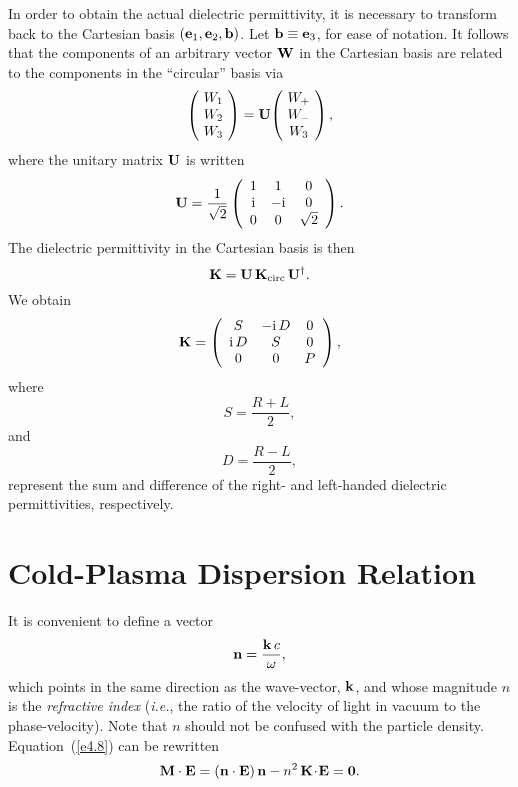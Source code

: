 In order to obtain the actual dielectric permittivity, it is necessary
to transform back to the Cartesian basis $({\bf e}_1, {\bf e}_2, {\bf b})$.
Let ${\bf b} \equiv {\bf e}_3$, for ease of notation. It follows that
the components of an arbitrary vector ${\bf W}$ in the Cartesian basis are
related to the components in the ``circular'' basis via
\begin{equation}
\left(\!\begin{array}{c} W_1 \\ W_2 \\ W_3 \end{array}\! \right) = 
{\bf U} \!\left(\!\begin{array}{c} W_+ \\ W_- \\ W_3 \end{array}\! \right),
\end{equation}
where the unitary matrix ${\bf U}$ is written
\begin{equation}
{\bf U} = \frac{1}{\sqrt{2}}\left(\begin{array}{ccc}
1&1&0\\
{\rm i} & -{\rm i}&0\\
0&0&\sqrt{2}\end{array}
\right).
\end{equation}
The dielectric permittivity in the Cartesian basis is then
\begin{equation}
{\bf K} = {\bf U}\, {\bf K}_{\rm circ}\, {\bf U}^\dag.
\end{equation}
We obtain
\begin{equation}\label{e4.36x}
{\bf K} = \left(\begin{array}{ccc}
S&-{\rm i}\,D&0\\
{\rm i}\,D & S&0\\
0&0&P\end{array}
\right),
\end{equation}
where 
\begin{equation}
S =\frac{R+L}{2},
\end{equation}
and
\begin{equation}
D = \frac{R-L}{2},
\end{equation}
represent the sum and difference of the right- and left-handed dielectric
permittivities, respectively.

\section{Cold-Plasma Dispersion Relation}
It is convenient to define a vector
\begin{equation}
{\bf n} = \frac{{\bf k}\,c}{\omega},
\end{equation}
which points in the same direction as the wave-vector, ${\bf k}$, 
and whose  magnitude
$n$  is the {\em refractive index}\/ ({\em i.e.}, the ratio of the
velocity of light in vacuum to the phase-velocity). Note that $n$ should not be
confused with the particle density. 
Equation~(\ref{e4.8}) can be rewritten
\begin{equation}\label{e4.29}
{\bf M}\cdot{\bf E} =({\bf n}\cdot{\bf E})\,{\bf n} - n^2\, {\bf K}\!\cdot\!{\bf E} = {\bf 0}.
\end{equation}

